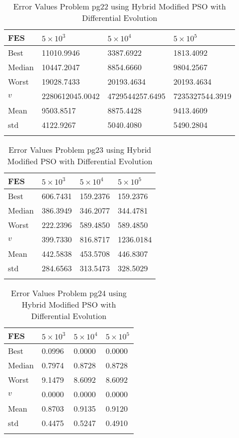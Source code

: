 \documentclass[10pt, a4paper]{book}
\begin{document}
\begin{center}
\begin{longtable}{l l l l}
FES & $5 \times 10^{3}$ & $5 \times 10^{4}$ & $5 \times 10^{5}$ \\
\hline
Best & 11010.9946 & 3387.6922 & 1813.4092 \\
Median & 10447.2047 & 8854.6660 & 9804.2567 \\
Worst & 19028.7433 & 20193.4634 & 20193.4634 \\
$v$ & 2280612045.0042 & 4729544257.6495 & 7235327544.3919 \\
Mean & 9503.8517 & 8875.4428 & 9413.4609 \\
std & 4122.9267 & 5040.4080 & 5490.2804 \\
\caption{ Error Values Problem pg22 using Hybrid Modified PSO with Differential Evolution }
\end{longtable}
\end{center}

\begin{center}
\begin{longtable}{l l l l}
FES & $5 \times 10^{3}$ & $5 \times 10^{4}$ & $5 \times 10^{5}$ \\
\hline
Best & 606.7431 & 159.2376 & 159.2376 \\
Median & 386.3949 & 346.2077 & 344.4781 \\
Worst & 222.2396 & 589.4850 & 589.4850 \\
$v$ & 399.7330 & 816.8717 & 1236.0184 \\
Mean & 442.5838 & 453.5708 & 446.8307 \\
std & 284.6563 & 313.5473 & 328.5029 \\
\caption{ Error Values Problem pg23 using Hybrid Modified PSO with Differential Evolution }
\end{longtable}
\end{center}

\begin{center}
\begin{longtable}{l l l l}
FES & $5 \times 10^{3}$ & $5 \times 10^{4}$ & $5 \times 10^{5}$ \\
\hline
Best & 0.0996 & 0.0000 & 0.0000 \\
Median & 0.7974 & 0.8728 & 0.8728 \\
Worst & 9.1479 & 8.6092 & 8.6092 \\
$v$ & 0.0000 & 0.0000 & 0.0000 \\
Mean & 0.8703 & 0.9135 & 0.9120 \\
std & 0.4475 & 0.5247 & 0.4910 \\
\caption{ Error Values Problem pg24 using Hybrid Modified PSO with Differential Evolution }
\end{longtable}
\end{center}
\end{document}
